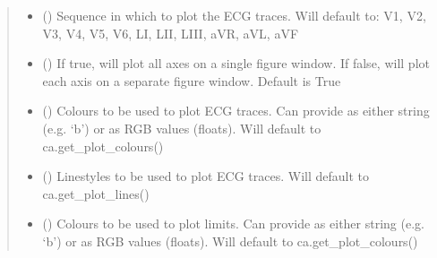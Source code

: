 \documentclass[letterpaper,10pt,english]{sphinxmanual}
\begin{document}
\begin{fulllineitems}
\begin{quote}
\begin{description}
\begin{itemize}
\item {} 
\sphinxAtStartPar
{} (\sphinxstyleliteralemphasis{\sphinxupquote{, }}) \textendash{} Sequence in which to plot the ECG traces. Will default to: V1, V2, V3, V4, V5, V6, LI, LII, LIII, aVR, aVL, aVF

\item {} 
\sphinxAtStartPar
{} (\sphinxstyleliteralemphasis{\sphinxupquote{, }}) \textendash{} If true, will plot all axes on a single figure window. If false, will plot each axis on a separate figure
window. Default is True

\item {} 
\sphinxAtStartPar
{} (\sphinxstyleliteralemphasis{\sphinxupquote{, }}) \textendash{} Colours to be used to plot ECG traces. Can provide as either string (e.g. ‘b’) or as RGB values (floats). Will
default to ca.get\_plot\_colours()

\item {} 
\sphinxAtStartPar
{} (\sphinxstyleliteralemphasis{\sphinxupquote{, }}) \textendash{} Linestyles to be used to plot ECG traces. Will default to ca.get\_plot\_lines()

\item {} 
\sphinxAtStartPar
{} (\sphinxstyleliteralemphasis{\sphinxupquote{, }}) \textendash{} Colours to be used to plot limits. Can provide as either string (e.g. ‘b’) or as RGB values (floats). Will
default to ca.get\_plot\_colours()


\end{itemize}
\end{description}
\end{quote}
\end{fulllineitems}
\end{document}

